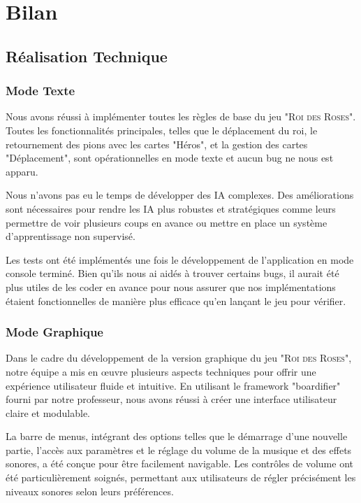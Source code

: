 \chapter{Bilan}

\section{Réalisation Technique}

\subsection*{Mode Texte}

Nous avons réussi à implémenter toutes les règles de base du jeu "\textsc{Roi des Roses}". Toutes les fonctionnalités principales, telles que le déplacement du roi, le retournement des pions avec les cartes "Héros", et la gestion des cartes "Déplacement", sont opérationnelles en mode texte et aucun bug ne nous est apparu.

Nous n'avons pas eu le temps de développer des IA complexes. Des améliorations sont nécessaires pour rendre les IA plus robustes et stratégiques comme leurs permettre de voir plusieurs coups en avance ou mettre en place un système d'apprentissage non supervisé.

Les tests ont été implémentés une fois le développement de l'application en mode console terminé. Bien qu'ils nous ai aidés à trouver certains bugs, il aurait été plus utiles de les coder en avance pour nous assurer que nos implémentations étaient fonctionnelles de manière plus efficace qu'en lançant le jeu pour vérifier.

\subsection*{Mode Graphique}

Dans le cadre du développement de la version graphique du jeu "\textsc{Roi des Roses}", notre équipe a mis en œuvre plusieurs aspects techniques pour offrir une expérience utilisateur fluide et intuitive. En utilisant le framework "boardifier" fourni par notre professeur, nous avons réussi à créer une interface utilisateur claire et modulable. 

La barre de menus, intégrant des options telles que le démarrage d'une nouvelle partie, l'accès aux paramètres et le réglage du volume de la musique et des effets sonores, a été conçue pour être facilement navigable. Les contrôles de volume ont été particulièrement soignés, permettant aux utilisateurs de régler précisément les niveaux sonores selon leurs préférences.

